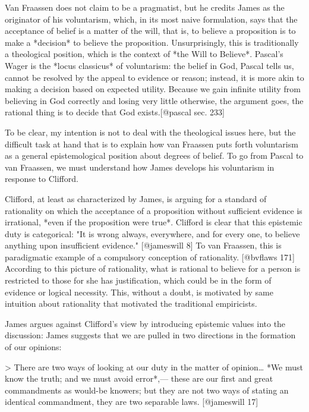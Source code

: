 Van Fraassen does not claim to be a pragmatist, but he credits James as
the originator of his voluntarism, which, in its most naive formulation,
says that the acceptance of belief is a matter of the will, that is, to
believe a proposition is to make a *decision* to believe the
proposition. Unsurprisingly, this is traditionally a theological
position, which is the context of *the Will to Believe*. Pascal's Wager
is the *locus classicus* of voluntarism: the belief in God, Pascal tells
us, cannot be resolved by the appeal to evidence or reason; instead, it
is more akin to making a decision based on expected utility. Because we
gain infinite utility from believing in God correctly and losing very
little otherwise, the argument goes, the rational thing is to decide
that God exists.{[}@pascal sec. 233{]}

To be clear, my intention is not to deal with the theological issues
here, but the difficult task at hand that is to explain how van Fraassen
puts forth voluntarism as a general epistemological position about
degrees of belief. To go from Pascal to van Fraassen, we must understand
how James develops his voluntarism in response to Clifford.

Clifford, at least as characterized by James, is arguing for a standard
of rationality on which the acceptance of a proposition without
sufficient evidence is irrational, *even if the proposition were true*.
Clifford is clear that this epistemic duty is categorical: "It is wrong
always, everywhere, and for every one, to believe anything upon
insufficient evidence." {[}@jameswill 8{]} To van Fraassen, this is
paradigmatic example of a compulsory conception of rationality.
{[}@bvflaws 171{]} According to this picture of rationality, what is
rational to believe for a person is restricted to those for she has
justification, which could be in the form of evidence or logical
necessity. This, without a doubt, is motivated by same intuition about
rationality that motivated the traditional empiricists.

James argues against Clifford's view by introducing epistemic values
into the discussion: James suggests that we are pulled in two directions
in the formation of our opinions:

\textgreater{} There are two ways of looking at our duty in the matter
of opinion\ldots{} *We must know the truth; and we must avoid error*,---
these are our first and great commandments as would-be knowers; but they
are not two ways of stating an identical commandment, they are two
separable laws. {[}@jameswill 17{]}

